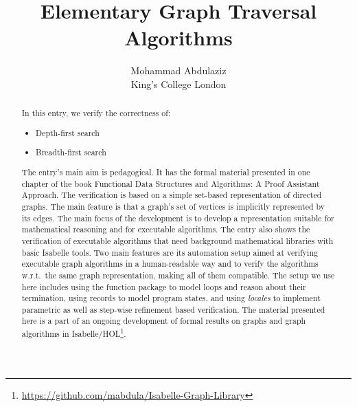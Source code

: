 \documentclass[11pt,a4paper]{article}
\begin{document}
\title{Elementary Graph Traversal Algorithms}
\author{Mohammad Abdulaziz\\ King's College London}
\maketitle

\begin{abstract}
In this entry, we verify the correctness of:
\begin{itemize}
  \item Depth-first search
  \item Breadth-first search
\end{itemize}

The entry's main aim is pedagogical.
It has the formal material presented in one chapter of the book Functional Data Structures and Algorithms:
A Proof Assistant Approach.
The verification is based on a simple set-based representation of directed graphs. The main feature
is that a graph's set of vertices is implicitly represented by its edges. The main focus of the
development is to develop a representation suitable for mathematical reasoning and for executable
algorithms.
The entry also shows the verification of executable algorithms that need background mathematical
libraries with basic Isabelle tools.
Two main features are its automation setup aimed at verifying executable graph algorithms in 
a human-readable way and to verify the algorithms w.r.t.\ the same graph representation, making all
of them compatible.
The setup we use here includes using the function package to model loops and reason about their
termination, using records to model program states, and using \emph{locales} to implement parametric
as well as step-wise refinement based verification.
The material presented here is a part of an ongoing development of formal results on graphs and graph
algorithms in Isabelle/HOL\footnote{\url{https://github.com/mabdula/Isabelle-Graph-Library}}.
\end{abstract}

\tableofcontents





\end{document}
